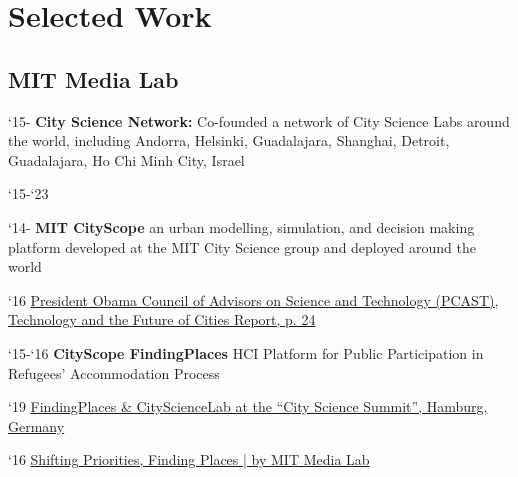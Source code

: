 \section*{Selected Work}

\subsection*{MIT Media Lab}

\begin{tablist}

   \item[`15-] \tab \textbf{City Science Network:} {Co-founded a network of City Science Labs around the world, including Andorra, Helsinki, Guadalajara, Shanghai, Detroit, Guadalajara, Ho Chi Minh City, Israel}

   \begin{tablist}
      \item[`15-`23] 
   \end{tablist}


   \item[`14-] \tab \textbf{MIT CityScope} {an urban modelling, simulation, and decision making platform developed at the MIT City Science group and deployed around the world}

   \begin{tablist}
      \item[`16] \tab \href{https://obamawhitehouse.archives.gov/blog/2016/02/23/pcast-releases-technology-and-future-cities-report-president}{President Obama Council of Advisors on Science and Technology (PCAST), Technology and the Future of Cities Report, p. 24}
   \end{tablist}

   \item[`15-`16] \tab \textbf{CityScope FindingPlaces} {HCI Platform for Public Participation in Refugees' Accommodation Process}

   \begin{tablist}

      \item[`19] \tab \href{https://www.youtube.com/watch?v=PZg6A_A65lQ}{FindingPlaces \& CityScienceLab at the “City Science Summit”, Hamburg, Germany}

      \item[`16] \tab  \href{https://medium.com/mit-media-lab/shifting-priorities-finding-places-9ad3bdbe38b8}{Shifting Priorities, Finding Places | by MIT Media Lab}


\end{tablist}
\end{tablist}

